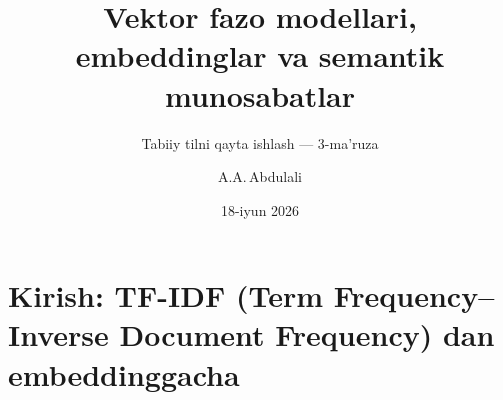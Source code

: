 \documentclass[aspectratio=169,11pt]{beamer}
\title[Vektor fazo va embeddinglar]{Vektor fazo modellari, embeddinglar va semantik munosabatlar}
\subtitle{Tabiiy tilni qayta ishlash --- 3-ma'ruza}
\author[A.A.\,Abdulali]{A.A.\,Abdulali}
\date{18-iyun 2026}
\institute{11:00--12:20 \quad$\cdot$\quad mavzu \textnumero{}3}
\begin{document}

\maketitle

\section[Kirish]{Kirish: TF-IDF (Term Frequency--Inverse Document Frequency) dan embeddinggacha}
\end{document}
